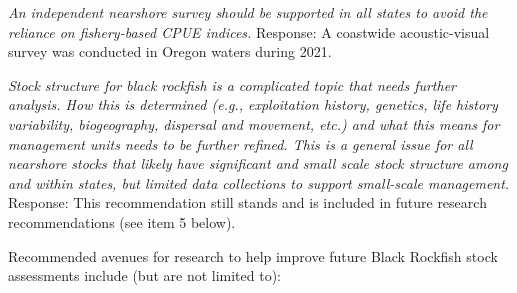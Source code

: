 \documentclass[11pt,
  letterpaper,
]{article}
\begin{document}
\textit{An independent nearshore survey should be supported in all states to avoid the reliance on fishery-based CPUE indices.} Response: A coastwide acoustic-visual survey was conducted in Oregon waters during 2021.

\textit{Stock structure for black rockfish is a complicated topic that needs further analysis. How this is determined (e.g., exploitation history, genetics, life history variability, biogeography, dispersal and movement, etc.) and what this means for management units needs to be further refined. This is a general issue for all nearshore stocks that likely have significant and small scale stock structure among and within states, but limited data collections to support small-scale management.} Response: This recommendation still stands and is included in future research recommendations (see item 5 below).

Recommended avenues for research to help improve future Black Rockfish stock assessments include (but are not limited to):
\end{document}
